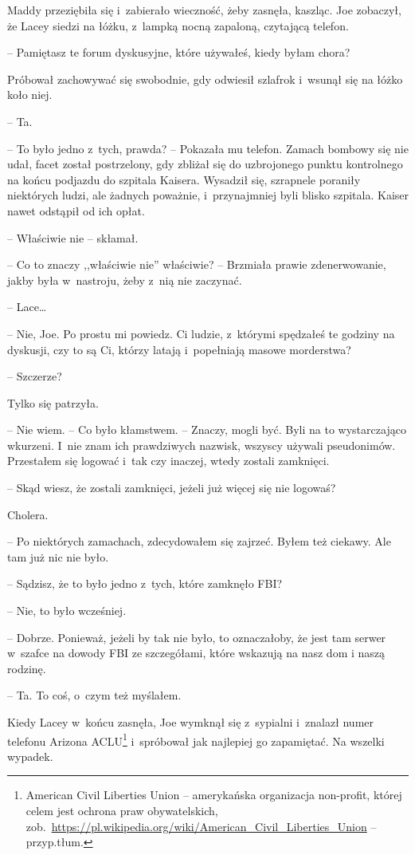 \documentclass[oneside,polish,11pt,sfheadings]{mwbk}
\begin{document}
Maddy przeziębiła się i~zabierało wieczność, żeby zasnęła, kaszląc. Joe
zobaczył, że Lacey siedzi na łóżku, z~lampką nocną zapaloną, czytającą
telefon.

-- Pamiętasz te forum dyskusyjne, które używałeś, kiedy byłam chora?

Próbował zachowywać się swobodnie, gdy odwiesił szlafrok i~wsunął się na
łóżko koło niej. 

-- Ta.

-- To było jedno z~tych, prawda? -- Pokazała mu telefon. Zamach bombowy
się nie udał, facet został postrzelony, gdy zbliżał się do uzbrojonego
punktu kontrolnego na końcu podjazdu do szpitala Kaisera. Wysadził się,
szrapnele poraniły niektórych ludzi, ale żadnych poważnie, i~przynajmniej byli blisko szpitala. Kaiser nawet odstąpił od ich opłat.

-- Właściwie nie -- skłamał.

-- Co to znaczy ,,właściwie nie'' właściwie? -- Brzmiała prawie
zdenerwowanie, jakby była w~nastroju, żeby z~nią nie zaczynać.

-- Lace\ldots 

-- Nie, Joe. Po prostu mi powiedz. Ci ludzie, z~którymi spędzałeś te
godziny na dyskusji, czy to są Ci, którzy latają i~popełniają masowe
morderstwa?

-- Szczerze?

Tylko się patrzyła.

-- Nie wiem. -- Co było kłamstwem. -- Znaczy, mogli być. Byli na to
wystarczająco wkurzeni. I~nie znam ich prawdziwych nazwisk, wszyscy
używali pseudonimów. Przestałem się logować i~tak czy inaczej, wtedy
zostali zamknięci.

-- Skąd wiesz, że zostali zamknięci, jeżeli już więcej się nie logowaś?

Cholera. 

-- Po niektórych zamachach, zdecydowałem się zajrzeć. Byłem też
ciekawy. Ale tam już nic nie było.

-- Sądzisz, że to było jedno z~tych, które zamknęło FBI?

-- Nie, to było wcześniej.

-- Dobrze. Ponieważ, jeżeli by tak nie było, to oznaczałoby, że jest tam
serwer w~szafce na dowody FBI ze szczegółami, które wskazują na nasz dom
i naszą rodzinę.

-- Ta. To coś, o~czym też myślałem.

Kiedy Lacey w~końcu zasnęła, Joe wymknął się z~sypialni i~znalazł numer
telefonu Arizona ACLU\footnote{ American Civil Liberties Union -- amerykańska
organizacja non-profit, której celem jest ochrona praw obywatelskich,
zob.~\url{https://pl.wikipedia.org/wiki/American\_Civil\_Liberties\_Union}
-- przyp.tłum.} i~spróbował jak najlepiej go zapamiętać. Na wszelki
wypadek.
\end{document}
